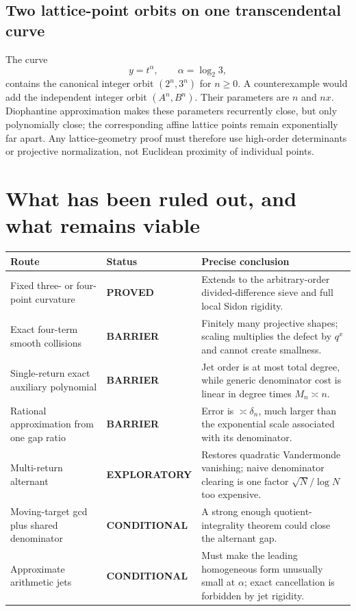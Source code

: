 \documentclass[11pt]{article}
\theoremstyle{definition}
\theoremstyle{remark}
\newcommand{\statusproved}{\textcolor{green!35!black}{\textbf{PROVED}}}
\newcommand{\statusconditional}{\textcolor{orange!70!black}{\textbf{CONDITIONAL}}}
\newcommand{\statusexploratory}{\textcolor{blue!60!black}{\textbf{EXPLORATORY}}}
\newcommand{\statusblocked}{\textcolor{red!60!black}{\textbf{BARRIER}}}
\begin{document}
\subsection{Two lattice-point orbits on one transcendental curve}

The curve
\[
 y=t^\alpha,\qquad \alpha=\log_2 3,
\]
contains the canonical integer orbit $(2^n,3^n)$ for $n\ge0$. A counterexample would add the independent integer orbit $(A^n,B^n)$. Their parameters are $n$ and $nx$. Diophantine approximation makes these parameters recurrently close, but only polynomially close; the corresponding affine lattice points remain exponentially far apart. Any lattice-geometry proof must therefore use high-order determinants or projective normalization, not Euclidean proximity of individual points.

\section{What has been ruled out, and what remains viable}\label{sec:scorecard}

\begin{center}
\small
\begin{tabular}{@{}p{36mm}p{38mm}p{72mm}@{}}
\toprule
Route & Status & Precise conclusion\\
\midrule
Fixed three- or four-point curvature & \statusproved & Extends to the arbitrary-order divided-difference sieve and full local Sidon rigidity.\\
Exact four-term smooth collisions & \statusblocked & Finitely many projective shapes; scaling multiplies the defect by $q^x$ and cannot create smallness.\\
Single-return exact auxiliary polynomial & \statusblocked & Jet order is at most total degree, while generic denominator cost is linear in degree times $M_n\asymp n$.\\
Rational approximation from one gap ratio & \statusblocked & Error is $\asymp\delta_n$, much larger than the exponential scale associated with its denominator.\\
Multi-return alternant & \statusexploratory & Restores quadratic Vandermonde vanishing; naive denominator clearing is one factor $\sqrt N/\log N$ too expensive.\\
Moving-target gcd plus shared denominator & \statusconditional & A strong enough quotient-integrality theorem could close the alternant gap.\\
Approximate arithmetic jets & \statusconditional & Must make the leading homogeneous form unusually small at $\alpha$; exact cancellation is forbidden by jet rigidity.\\
\bottomrule
\end{tabular}
\end{center}
\end{document}
